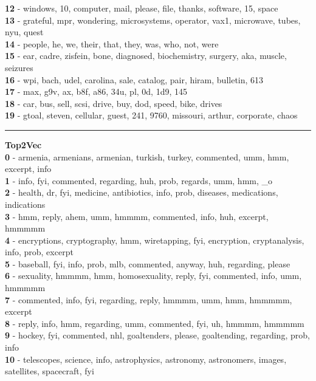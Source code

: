 \textbf{12} - windows, 10, computer, mail, please, file, thanks, software, 15, space\\
\textbf{13} - grateful, mpr, wondering, microsystems, operator, vax1, microwave, tubes, nyu, quest\\
\textbf{14} - people, he, we, their, that, they, was, who, not, were\\
\textbf{15} - ear, cadre, zisfein, bone, diagnosed, biochemistry, surgery, aka, muscle, seizures\\
\textbf{16} - wpi, bach, udel, carolina, sale, catalog, pair, hiram, bulletin, 613\\
\textbf{17} - max, g9v, ax, b8f, a86, 34u, pl, 0d, 1d9, 145\\
\textbf{18} - car, bus, sell, scsi, drive, buy, dod, speed, bike, drives\\
\textbf{19} - gtoal, steven, cellular, guest, 241, 9760, missouri, arthur, corporate, chaos\\
\hrule\vspace{2mm}
\noindent
\textbf{Top2Vec}\vspace{2mm}\\
\vspace{2mm}
\noindent
\textbf{0} - armenia, armenians, armenian, turkish, turkey, commented, umm, hmm, excerpt, info\\
\textbf{1} - info, fyi, commented, regarding, huh, prob, regards, umm, hmm, \_o\\
\textbf{2} - health, dr, fyi, medicine, antibiotics, info, prob, diseases, medications, indications\\
\textbf{3} - hmm, reply, ahem, umm, hmmmm, commented, info, huh, excerpt, hmmmmm\\
\textbf{4} - encryptions, cryptography, hmm, wiretapping, fyi, encryption, cryptanalysis, info, prob, excerpt\\
\textbf{5} - baseball, fyi, info, prob, mlb, commented, anyway, huh, regarding, please\\
\textbf{6} - sexuality, hmmmm, hmm, homosexuality, reply, fyi, commented, info, umm, hmmmmm\\
\textbf{7} - commented, info, fyi, regarding, reply, hmmmm, umm, hmm, hmmmmm, excerpt\\
\textbf{8} - reply, info, hmm, regarding, umm, commented, fyi, uh, hmmmm, hmmmmm\\
\textbf{9} - hockey, fyi, commented, nhl, goaltenders, please, goaltending, regarding, prob, info\\
\textbf{10} - telescopes, science, info, astrophysics, astronomy, astronomers, images, satellites, spacecraft, fyi\\
